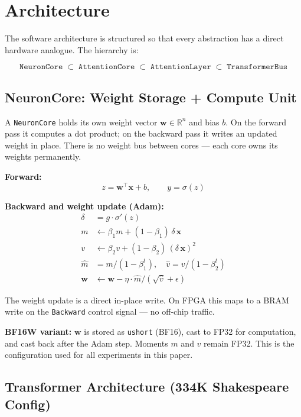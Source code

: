 \documentclass[11pt]{article}
\begin{document}
\section{Architecture}

The software architecture is structured so that every abstraction has a direct
hardware analogue. The hierarchy is:

\[
\texttt{NeuronCore} \;\subset\; \texttt{AttentionCore} \;\subset\;
\texttt{AttentionLayer} \;\subset\; \texttt{TransformerBus}
\]

\subsection{NeuronCore: Weight Storage + Compute Unit}

A \texttt{NeuronCore} holds its own weight vector $\mathbf{w} \in \mathbb{R}^n$
and bias $b$. On the forward pass it computes a dot product; on the backward pass
it writes an updated weight in place. There is no weight bus between cores --- each
core owns its weights permanently.

\textbf{Forward:}
\begin{equation}
z = \mathbf{w}^\top \mathbf{x} + b, \qquad y = \sigma(z)
\end{equation}

\textbf{Backward and weight update (Adam):}
\begin{align}
\delta &= g \cdot \sigma'(z) \\
m &\leftarrow \beta_1 m + (1-\beta_1)\,\delta\,\mathbf{x} \\
v &\leftarrow \beta_2 v + (1-\beta_2)\,(\delta\,\mathbf{x})^2 \\
\hat{m} &= m / (1-\beta_1^t), \quad \hat{v} = v / (1-\beta_2^t) \\
\mathbf{w} &\leftarrow \mathbf{w} - \eta \cdot \hat{m} / (\sqrt{\hat{v}} + \epsilon)
\end{align}

The weight update is a direct in-place write. On FPGA this maps to a BRAM write
on the \texttt{Backward} control signal --- no off-chip traffic.

\textbf{BF16W variant:} $\mathbf{w}$ is stored as \texttt{ushort} (BF16), cast to
FP32 for computation, and cast back after the Adam step. Moments $m$ and $v$ remain FP32.
This is the configuration used for all experiments in this paper.

\subsection{Transformer Architecture (334K Shakespeare Config)}
\end{document}
